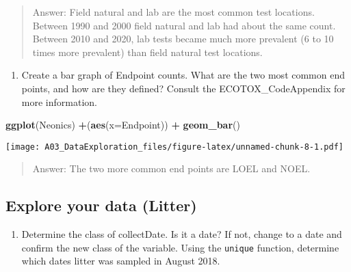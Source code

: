 \documentclass[]{article}
\newenvironment{Shaded}{\begin{snugshade}}{\end{snugshade}}
\newcommand{\DataTypeTok}[1]{\textcolor[rgb]{0.13,0.29,0.53}{#1}}
\newcommand{\KeywordTok}[1]{\textcolor[rgb]{0.13,0.29,0.53}{\textbf{#1}}}
\newcommand{\NormalTok}[1]{#1}
\newcommand{\OperatorTok}[1]{\textcolor[rgb]{0.81,0.36,0.00}{\textbf{#1}}}
\newcommand{\StringTok}[1]{\textcolor[rgb]{0.31,0.60,0.02}{#1}}
\providecommand{\tightlist}{%
  \setlength{\itemsep}{0pt}\setlength{\parskip}{0pt}}
\begin{document}
\begin{quote}
Answer: Field natural and lab are the most common test locations.
Between 1990 and 2000 field natural and lab had about the same count.
Between 2010 and 2020, lab tests became much more prevalent (6 to 10
times more prevalent) than field natural test locations.
\end{quote}

\begin{enumerate}
\def\labelenumi{\arabic{enumi}.}
\setcounter{enumi}{10}
\tightlist
\item
  Create a bar graph of Endpoint counts. What are the two most common
  end points, and how are they defined? Consult the ECOTOX\_CodeAppendix
  for more information.
\end{enumerate}

\begin{Shaded}
\begin{Highlighting}[]
\KeywordTok{ggplot}\NormalTok{(Neonics) }\OperatorTok{+}\NormalTok{(}\KeywordTok{aes}\NormalTok{(}\DataTypeTok{x=}\NormalTok{Endpoint)) }\OperatorTok{+}\StringTok{ }\KeywordTok{geom_bar}\NormalTok{()}
\end{Highlighting}
\end{Shaded}

\texttt{[image: A03\_DataExploration\_files/figure-latex/unnamed-chunk-8-1.pdf]}

\begin{quote}
Answer: The two more common end points are LOEL and NOEL.
\end{quote}

\hypertarget{explore-your-data-litter}{%
\subsection{Explore your data (Litter)}\label{explore-your-data-litter}}

\begin{enumerate}
\def\labelenumi{\arabic{enumi}.}
\setcounter{enumi}{11}
\tightlist
\item
  Determine the class of collectDate. Is it a date? If not, change to a
  date and confirm the new class of the variable. Using the
  \texttt{unique} function, determine which dates litter was sampled in
  August 2018.
\end{enumerate}

\begin{Shaded}
\end{Shaded}
\end{document}
